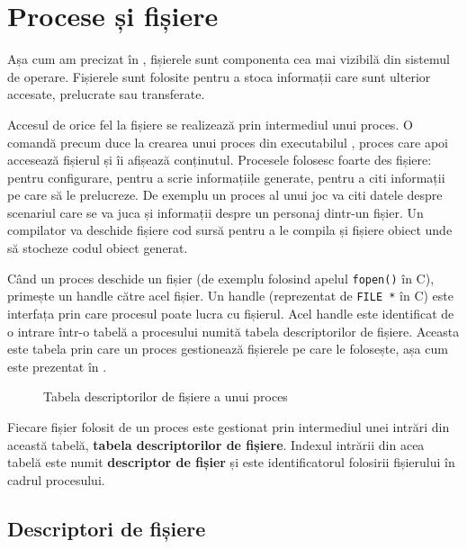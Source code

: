 \section{Procese și fișiere}
\label{sec:procese-fisiere}

Așa cum am precizat în ,
fișierele sunt componenta cea mai vizibilă din sistemul de operare. Fișierele
sunt folosite pentru a stoca informații care sunt ulterior accesate, prelucrate
sau transferate.

Accesul de orice fel la fișiere se realizează prin intermediul unui proces. O
comandă precum  duce la crearea unui proces din executabilul ,
proces care apoi accesează fișierul  și îi afișează conținutul. Procesele
folosesc foarte des fișiere: pentru configurare, pentru a scrie informațiile
generate, pentru a citi informații pe care să le prelucreze. De exemplu un
proces al unui joc va citi datele despre scenariul care se va juca și informații
despre un personaj dintr-un fișier. Un compilator va deschide fișiere cod sursă
pentru a le compila și fișiere obiect unde să stocheze codul obiect generat.

Când un proces deschide un fișier (de exemplu folosind apelul \texttt{fopen()} în C),
primește un handle către acel fișier. Un handle (reprezentat de \texttt{FILE *} în C)
este interfața prin care procesul poate lucra cu fișierul. Acel handle este
identificat de o intrare într-o tabelă a procesului numită tabela descriptorilor
de fișiere. Aceasta este tabela prin care un proces gestionează fișierele pe
care le folosește, așa cum este prezentat în .

\begin{figure}[!htbp]
	\centering
	\def\svgwidth{0.8\textwidth}
	
	\caption{Tabela descriptorilor de fișiere a unui proces}
	\label{fig:process-fdtab}
\end{figure}

Fiecare fișier folosit de un proces este gestionat prin intermediul unei intrări
din această tabelă, \textbf{tabela descriptorilor de fișiere}. Indexul intrării din acea
tabelă este numit \textbf{descriptor de fișier} și este identificatorul folosirii
fișierului în cadrul procesului.

\subsection{Descriptori de fișiere}
\label{sec:procese-fisiere-description}

